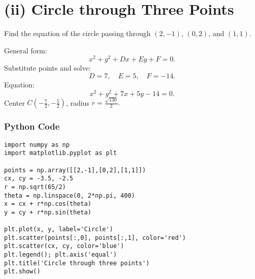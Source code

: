 \documentclass[10pt,twocolumn]{article}
\begin{document}
\section*{(ii) Circle through Three Points}

\begin{tcolorbox}
Find the equation of the circle passing through
$(2,-1)$, $(0,2)$, and $(1,1)$.
\end{tcolorbox}

General form:
\[
x^{2}+y^{2}+Dx+Ey+F=0.
\]
Substitute points and solve:
\[
D=7,\quad E=5,\quad F=-14.
\]
Equation:
\[
\boxed{x^{2}+y^{2}+7x+5y-14=0.}
\]
Center \(C(-\tfrac{7}{2},-\tfrac{5}{2})\),
radius \(r=\tfrac{\sqrt{130}}{2}.\)

\begin{center}
\end{center}

\subsubsection*{Python Code}
\begin{verbatim}
import numpy as np
import matplotlib.pyplot as plt

points = np.array([[2,-1],[0,2],[1,1]])
cx, cy = -3.5, -2.5
r = np.sqrt(65/2)
theta = np.linspace(0, 2*np.pi, 400)
x = cx + r*np.cos(theta)
y = cy + r*np.sin(theta)

plt.plot(x, y, label='Circle')
plt.scatter(points[:,0], points[:,1], color='red')
plt.scatter(cx, cy, color='blue')
plt.legend(); plt.axis('equal')
plt.title('Circle through three points')
plt.show()
\end{verbatim}
\end{document}
